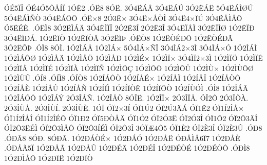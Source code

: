 {^^d3^^c95^^cf^^ce
^^d3^^c94^^d35^^d4^^c5^^cd^^cf
1^^d3^^cb2
.^^d3^^cb8
8^^d3^^cb.
3^^d34^^cb^^c1^^c2
3^^d34^^cb^^c1^^da
3^^d32^^cb^^c1^^cb
5^^d34^^cb^^c1^^cc^^d8^^da
5^^d34^^cb^^c1^^cc^^d1^^d2
3^^d34^^cb^^c1^^d5^^d4
.^^d3^^cb^^d78
2^^d33^^cb^^d7
3^^d34^^cb^^d7^^c5^^d2^^ce
3^^d34^^cb4^^d7^^cf^^da
3^^d34^^cb^^c5^^cc^^c5^^d4
^^d35^^cb^^c9^^ca.
.^^d3^^cb^^cc8
3^^d32^^cb^^cc^^c1^^c4
3^^d34^^cb^^cc^^cf^^ce
2^^d32^^cb3^^cd
2^^d32^^cb3^^ce
3^^d34^^cb^^cf^^c2^^cc
3^^d32^^cb^^cf^^cc^^d8
1^^d32^^cb^^cf^^d0
3^^d34^^cb^^cf^^d0^^c1.
1^^d32^^cb^^cf^^d2
1^^d32^^cb^^cf^^d2^^c2
3^^d32^^cb^^cf^^de
.^^d3^^cb^^d28
1^^d32^^cb^^d2^^c9^^d0^^d4
1^^d32^^cb^^d2^^c9^^d0^^c3
3^^d32^^cb^^d5^^de
.^^d3^^cc8
8^^d3^^cc.
1^^d32^^cc^^c1^^c2
1^^d32^^cc^^c1^^d7
5^^d34^^cc^^c1^^d7^^d1^^ce
3^^d34^^cc^^c12^^d73^^cc
3^^d34^^cc^^c1^^d7^^d3
1^^d32^^cc^^c1^^cc
1^^d32^^cc^^c1^^d4^^d8
1^^d32^^cc^^c5^^c4
1^^d32^^cc^^c5^^d6
1^^d32^^cc^^c5^^d0
1^^d32^^cc^^c9^^d7
1^^d32^^cc^^cf^^d7
3^^d34^^cc^^cf2^^d73^^cc
1^^d32^^cc^^cf^^d6
1^^d32^^cc^^cf^^ca
1^^d32^^cc^^cf^^c5
1^^d32^^cc^^cf^^c9
1^^d32^^cc^^cf^^c0
1^^d32^^cc^^cf^^d1
1^^d32^^cc^^d5^^c7
1^^d32^^cc^^d5^^d6
1^^d32^^cc^^d5^^db
1^^d32^^cc^^d9^^d7
1^^d32^^cc^^d9^^d4^^d8
1^^d32^^cc^^d9^^db
.^^d3^^cd8
.^^d3^^cd^^cc8
.^^d3^^cd^^d28
1^^d32^^cd^^c1^^d4^^d2
1^^d32^^cd^^c5^^c9^^d7
1^^d32^^cd^^c5^^cc
1^^d32^^cd^^c5^^ce
1^^d32^^cd^^c5^^d2^^d4
1^^d32^^cd^^c5^^c8
1^^d32^^cd^^c5^^db
1^^d32^^cd^^c5^^d1
1^^d32^^cd^^cf^^cc
1^^d32^^cd^^cf^^d2^^cb
1^^d32^^cd^^cf^^d4^^d2
1^^d32^^cd^^d9^^d3^^cc
.^^d3^^ce8
1^^d32^^ce^^c1^^c2
1^^d32^^ce^^c1^^d3^^d4
1^^d32^^ce^^c1^^dd
2^^d33^^ce^^c1^^d1.
1^^d32^^ce^^c5^^d6
8^^d3^^ce^^cb.
1^^d32^^ce^^cf^^d7
2^^d33^^ce^^cf^^c5.
^^d3^^ce2^^d4
2^^d33^^ce^^d5^^c0.
2^^d33^^ce^^d9^^c5.
2^^d33^^ce^^d9^^cd.
2^^d33^^ce^^d9^^c8.
1^^d3^^cf
^^d3^^cf2^^d73^^cd
^^d3^^cf1^^da2
^^d3^^cf2^^da3^^c4^^c1
^^d3^^cf1^^cb2
^^d3^^cf1^^cd2^^ce^^c5^^d7
^^d3^^cf1^^cd2^^ce^^c5^^ce
^^d3^^cf1^^cd2^^ce^^c9^^d4
^^d3^^cf1^^d02
^^d3^^cf5^^d0^^d2^^c5^^c4
^^d3^^cf1^^d32
^^d3^^cf2^^d33^^cb
^^d3^^cf2^^d33^^ce
^^d3^^cf1^^d42
^^d3^^cf2^^d43^^c4^^ce
^^d3^^cf2^^d43^^cb^^c9^^cc
^^d3^^cf2^^d43^^cc^^c5^^d4
^^d3^^cf2^^d43^^cd^^c9^^cc
^^d3^^cf2^^d43^^ce
3^^d3^^cf^^c64^^d45
^^d3^^cf1^^c82
^^d3^^cf2^^c83^^ce
^^d3^^cf2^^c83^^db
.^^d3^^d08
.^^d3^^d0^^c28
8^^d3^^d0.
8^^d3^^d0^^c2.
1^^d32^^d0^^c1^^d2^^c9^^d7
1^^d32^^d0^^c1^^d3
1^^d32^^d0^^c5^^cb
^^d3^^d0^^c5^^cc^^c56^^cf7
1^^d32^^d0^^c5^^c8
.^^d3^^d0^^c5^^c35^^cf
1^^d32^^d0^^c5^^c3
1^^d32^^d0^^c5^^db
1^^d32^^d0^^c9^^c4
1^^d32^^d0^^c9^^ce
1^^d32^^d0^^c9^^d2^^c9
1^^d32^^d0^^c9^^d2^^d4
.^^d3^^d0^^cc8
1^^d32^^d0^^cc^^c5^^d4
1^^d32^^d0^^cf^^cb
1^^d32^^d0^^cf^^d2
}
